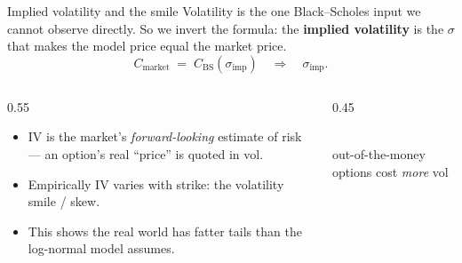 \documentclass[11pt,aspectratio=169]{beamer}
\newcommand{\call}{C}
\begin{document}
\begin{frame}{Implied volatility and the smile}
  Volatility is the one Black--Scholes input we cannot observe directly.
  So we \alert{invert} the formula: the \textbf{implied volatility} is the
  $\sigma$ that makes the model price equal the market price.
  \[
    \call_{\text{market}} \;=\; \call_{\text{BS}}(\sigma_{\text{imp}})
    \quad\Longrightarrow\quad \sigma_{\text{imp}} .
  \]
  \begin{columns}[c]
    \begin{column}{0.55\textwidth}
      \begin{itemize}\small
        \item IV is the market's \emph{forward-looking} estimate of risk — an option's real ``price'' is quoted in vol.
        \item Empirically IV varies with strike: the \alert{volatility smile / skew}.
        \item This shows the real world has fatter tails than the log-normal model assumes.
      \end{itemize}
    \end{column}
    \begin{column}{0.45\textwidth}
      \centering
      \\
      {\tiny\color{muted}out-of-the-money options cost \emph{more} vol}
    \end{column}
  \end{columns}
\end{frame}
\end{document}
